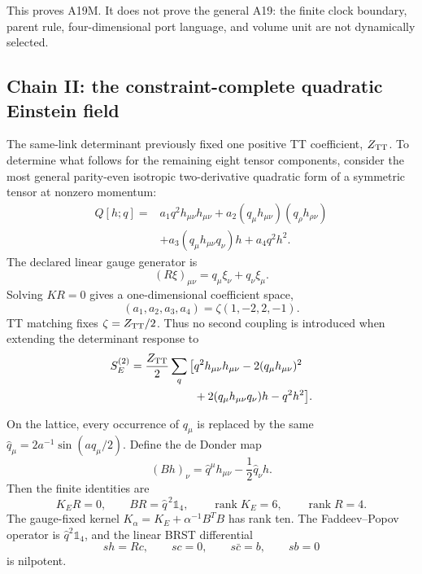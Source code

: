 This proves A19M.  It does not prove the general A19: the finite clock
boundary, parent rule, four-dimensional port language, and volume unit are
not dynamically selected.

\subsection{Chain II: the constraint-complete quadratic Einstein field}

The same-link determinant previously fixed one positive TT coefficient,
\(Z_{\rm TT}\).  To determine what follows for the remaining eight tensor
components, consider the most general parity-even isotropic two-derivative
quadratic form of a symmetric tensor at nonzero momentum:
\begin{align}
 Q[h;q]={}&a_1q^2h_{\mu\nu}h_{\mu\nu}
 +a_2(q_\mu h_{\mu\nu})(q_\rho h_{\rho\nu})\nonumber\\
 &+a_3(q_\mu h_{\mu\nu}q_\nu)h
 +a_4q^2h^2.
\label{eq:three-quadratic-ansatz}
\end{align}
The declared linear gauge generator is
\begin{equation}
 (R\xi)_{\mu\nu}=q_\mu\xi_\nu+q_\nu\xi_\mu .
\label{eq:three-gauge-generator}
\end{equation}
Solving \(KR=0\) gives a one-dimensional coefficient space,
\begin{equation}
 (a_1,a_2,a_3,a_4)=\zeta(1,-2,2,-1).
\label{eq:three-fp-unique}
\end{equation}
TT matching fixes \(\zeta=Z_{\rm TT}/2\).  Thus no second coupling is
introduced when extending the determinant response to
\begin{align}
 S_E^{(2)}=\frac{Z_{\rm TT}}2\sum_q\big[&
 q^2h_{\mu\nu}h_{\mu\nu}
 -2(q_\mu h_{\mu\nu})^2\nonumber\\
 &+2(q_\mu h_{\mu\nu}q_\nu)h-q^2h^2\big].
\label{eq:three-fierz-pauli}
\end{align}

On the lattice, every occurrence of \(q_\mu\) is replaced by the same
\(\widehat q_\mu=2a^{-1}\sin(aq_\mu/2)\).  Define the de Donder map
\begin{equation}
 (Bh)_\nu=\widehat q^\mu h_{\mu\nu}
 -\frac12\widehat q_\nu h .
\label{eq:three-de-donder}
\end{equation}
Then the finite identities are
\begin{equation}
 K_E R=0,\qquad
 B R=\widehat q^{\,2}\mathbb 1_4,\qquad
 \operatorname{rank}K_E=6,\qquad
 \operatorname{rank}R=4.
\label{eq:three-finite-ward}
\end{equation}
The gauge-fixed kernel
\(K_\alpha=K_E+\alpha^{-1}B^TB\) has rank ten.  The
Faddeev--Popov operator is \(\widehat q^2\mathbb 1_4\), and the linear BRST
differential
\begin{equation}
 sh=Rc,\qquad sc=0,\qquad
 s\bar c=b,\qquad sb=0
\label{eq:three-brst}
\end{equation}
is nilpotent.

